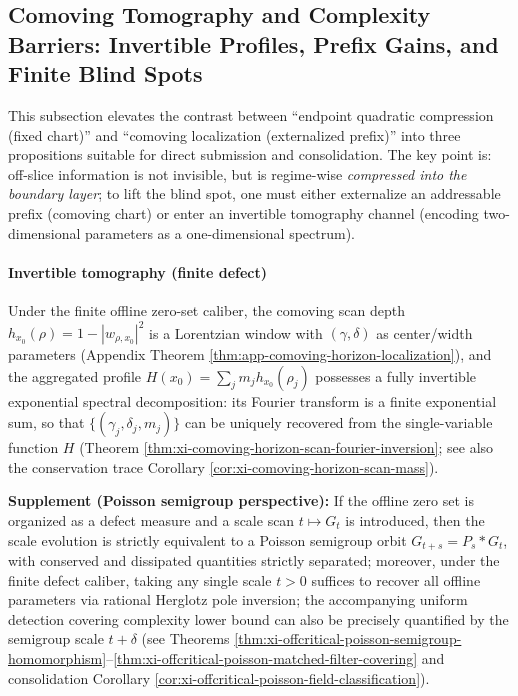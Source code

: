 \subsection{Comoving Tomography and Complexity Barriers: Invertible Profiles, Prefix Gains, and Finite Blind Spots}\label{subsec:discussion-comoving-tomography-prefix-budget-blindspot}
This subsection elevates the contrast between ``endpoint quadratic compression (fixed chart)'' and ``comoving localization (externalized prefix)'' into three propositions suitable for direct submission and consolidation.
The key point is: off-slice information is not invisible, but is regime-wise \emph{compressed into the boundary layer}; to lift the blind spot, one must either externalize an addressable prefix (comoving chart) or enter an invertible tomography channel (encoding two-dimensional parameters as a one-dimensional spectrum).

\paragraph{Invertible tomography (finite defect)}
Under the finite offline zero-set caliber, the comoving scan depth
\(
h_{x_0}(\rho)=1-|w_{\rho,x_0}|^2
\)
is a Lorentzian window with \((\gamma,\delta)\) as center/width parameters (Appendix Theorem \ref{thm:app-comoving-horizon-localization}), and the aggregated profile
\(
H(x_0)=\sum_j m_j h_{x_0}(\rho_j)
\)
possesses a fully invertible exponential spectral decomposition: its Fourier transform is a finite exponential sum, so that \(\{(\gamma_j,\delta_j,m_j)\}\) can be uniquely recovered from the single-variable function \(H\) (Theorem \ref{thm:xi-comoving-horizon-scan-fourier-inversion}; see also the conservation trace Corollary \ref{cor:xi-comoving-horizon-scan-mass}).
\par
\textbf{Supplement (Poisson semigroup perspective):}
If the offline zero set is organized as a defect measure and a scale scan \(t\mapsto G_t\) is introduced, then the scale evolution is strictly equivalent to a Poisson semigroup orbit \(G_{t+s}=P_s*G_t\), with conserved and dissipated quantities strictly separated; moreover, under the finite defect caliber, taking any single scale \(t>0\) suffices to recover all offline parameters via rational Herglotz pole inversion; the accompanying uniform detection covering complexity lower bound can also be precisely quantified by the semigroup scale \(t+\delta\) (see Theorems \ref{thm:xi-offcritical-poisson-semigroup-homomorphism}--\ref{thm:xi-offcritical-poisson-matched-filter-covering} and consolidation Corollary \ref{cor:xi-offcritical-poisson-field-classification}).

